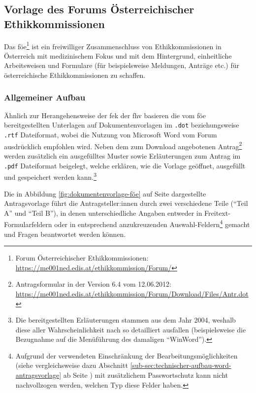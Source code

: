 \documentclass[a4paper,12pt,twoside,numbers=noendperiod]{scrreprt}
\begin{document}
\subsection{Vorlage des Forums Österreichischer Ethikkommissionen}
\label{sub-sec:vorlage-föe}

Das \ac{föe}\footnote{Forum Österreichischer Ethikkommissionen: \url{https://me001ned.edis.at/ethikkommission/Forum/}} ist ein freiwilliger Zusammenschluss von Ethikkommissionen in Österreich mit medizinischem Fokus und mit dem Hintergrund, einheitliche Arbeitsweisen und Formulare (für beispielsweise Meldungen, Anträge etc.) für österreichische Ethikkommissionen zu schaffen. \cite{ethikkommission_der_medizinischen_universitat_graz_forum_2019}

\subsubsection*{Allgemeiner Aufbau}
\label{sub-sub-sec:föe-allgemeiner-aufbau}

Ähnlich zur Herangehensweise der \acl{fek} der \acl{fhv} basieren die vom \ac{föe} bereitgestellten Unterlagen auf Dokumentenvorlagen im \texttt{.dot} beziehungsweise \texttt{.rtf} Dateiformat, wobei die Nutzung von Microsoft Word vom Forum ausdrücklich empfohlen wird. Neben dem zum Download angebotenen Antrag\footnote{Antragsformular in der Version 6.4 vom 12.06.2012: \url{https://me001ned.edis.at/ethikkommission/Forum/Download/Files/Antr.dot}} werden zusätzlich ein ausgefülltes Muster sowie Erläuterungen zum Antrag im \texttt{.pdf} Dateiformat beigelegt, welche erklären, wie die Vorlage geöffnet, ausgefüllt und gespeichert werden kann.\footnote{Die bereitgestellten Erläuterungen stammen aus dem Jahr 2004, weshalb diese aller Wahrscheinlichkeit nach so detailliert ausfallen (beispielsweise die Bezugnahme auf die Menüführung des damaligen \enquote{WinWord}).} \cite{ethikkommission_der_medizinischen_universitat_graz_download_2012}

\medskip

Die in Abbildung \ref{fig:dokumentenvorlage-föe} auf Seite \pageref{fig:dokumentenvorlage-föe} dargestellte Antragsvorlage führt die Antragsteller:innen durch zwei verschiedene Teile (\enquote{Teil A} und \enquote{Teil B}), in denen unterschiedliche Angaben entweder in Freitext-Formularfeldern oder in entsprechend anzukreuzenden Auswahl-Feldern\footnote{Aufgrund der verwendeten Einschränkung der Bearbeitungsmöglichkeiten (siehe vergleichsweise dazu Abschnitt \ref{sub-sec:technischer-aufbau-word-antragsvorlage} ab Seite \pageref{sub-sec:technischer-aufbau-word-antragsvorlage}) mit zusätzlichem Passwortschutz kann nicht nachvollzogen werden, welchen Typ diese Felder haben.} gemacht und Fragen beantwortet werden können.
\end{document}
